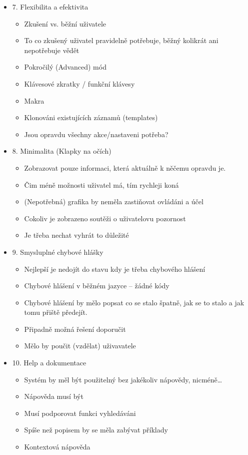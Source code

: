 \begin{itemize}
    \item 7. Flexibilita a efektivita
        \begin{itemize}
            \item Zkušení vs. běžní uživatele
            \item To co zkušený uživatel pravidelně potřebuje, běžný kolikrát ani nepotřebuje vědět
            \item Pokročilý (Advanced) mód
            \item Klávesové zkratky / funkční klávesy
            \item Makra
            \item Klonováni existujících záznamů (templates)
            \item Jsou opravdu všechny akce/nastaveni potřeba?
        \end{itemize}
    \item 8. Minimalita (Klapky na očích)
        \begin{itemize}
            \item Zobrazovat pouze informaci, která aktuálně k něčemu opravdu je.
            \item Čim méně možnosti uživatel má, tím rychleji koná
            \item (Nepotřebná) grafika by neměla zastiňovat ovládáni a účel
            \item Cokoliv je zobrazeno soutěži o uživatelovu pozornost
            \item Je třeba nechat vyhrát to důležité
        \end{itemize}
    \item 9. Smysluplné chybové hlášky
        \begin{itemize}
            \item Nejlepší je nedojít do stavu kdy je třeba chybového hlášení
            \item Chybové hlášení v běžném jazyce – žádné kódy
            \item Chybové hlášení by mělo popsat co se stalo špatně, jak se to stalo a jak tomu přiště předejít.
            \item Připadně možná řešení doporučit
            \item Mělo by poučit (vzdělat) uživavatele
        \end{itemize}
    \item 10. Help a dokumentace
        \begin{itemize}
            \item Systém by měl být použitelný bez jakékoliv nápovědy, nicméně…
            \item Nápověda musí být
            \item Musí podporovat funkci vyhledáváni
            \item Spíše než popisem by se měla zabývat příklady
            \item Kontextová nápověda
        \end{itemize}
\end{itemize}

